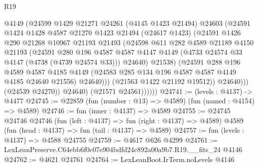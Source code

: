 \begin{lexlean}{R19}
\begin{coremodule}
                        @4149
                        (@24599
                          @1429
                          @21271
                          @24261
                          (@4145 @1423 @21494)
                          @24603
                          (@24591
                            @1424
                            @1428
                            @4587
                            @21270
                            @1423
                            @21494
                            (@24617 @1423)
                            (@24591
                              @1426
                              @290
                              @21268
                              @10967
                              @21193
                              @21493
                              (@24598
                                @611
                                @282
                                @4589
                                @21189
                                @4150
                                @21193
                                (@24591
                                  @280
                                  @196
                                  @4587
                                  @4587
                                  @4147
                                  @4149
                                  (@4733 @24574 @33 @4147 (@4738 (@4739 @24574 @33)))
                                  @24640)
                                @21538)
                              (@24591
                                @288
                                @196
                                @4589
                                @4587
                                @4185
                                @4149
                                (@24583 @285 @134 @196 @4587 @4587 @4149 @4185 @24640 @21556)
                                @24640)))
                          (@21563 @1422 @21192 @19512))
                        @24640)))
                  (@24539 @24270))
                @24640)
              (@21571 @24561))))))
@24741 := (levels : @4137) -> @4477
@24745 := @22859 (fun (number : @13) => @4589) (fun (named : @4154) => @4589)
@24746 := fun (inner : @4137) => @4589
@24755 := @24745
    @24746
    @24746
    (fun (left : @4137) => fun (right : @4137) => @4589)
    @4589
    (fun (head : @4137) => fun (tail : @4137) => @4589)
@24757 := fun (levels : @4137) => @4588 @24755
@24759 := @4617 @626 @4299
@24761 := LexLeanPreserve.C64ebb6f0c07e904bdfd24c892a00a9b7.R19.__fits_24 @4146
@24762 := @4621 @24761
@24764 := LexLeanBoot.IrTerm.noLevels @4146

\end{coremodule}
\end{lexlean}
